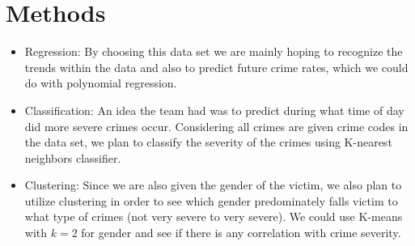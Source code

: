 \documentclass{article}
\begin{document}
\section{Methods}

\begin{itemize}
	\item Regression: By choosing this data set we are mainly hoping to recognize the trends within the data and also to predict future crime rates, which we could do with polynomial regression.
	\item Classification: An idea the team had was to predict during what time of day did more severe crimes occur. Considering all crimes are given crime codes in the data set, we plan to classify the severity of the crimes using K-nearest neighbors classifier.
	\item Clustering: Since we are also given the gender of the victim, we also plan to utilize clustering in order to see which gender predominately falls victim to what type of crimes (not very severe to very severe). We could use K-means with $k=2$ for gender and see if there is any correlation with crime severity.
\end{itemize}
\end{document}
